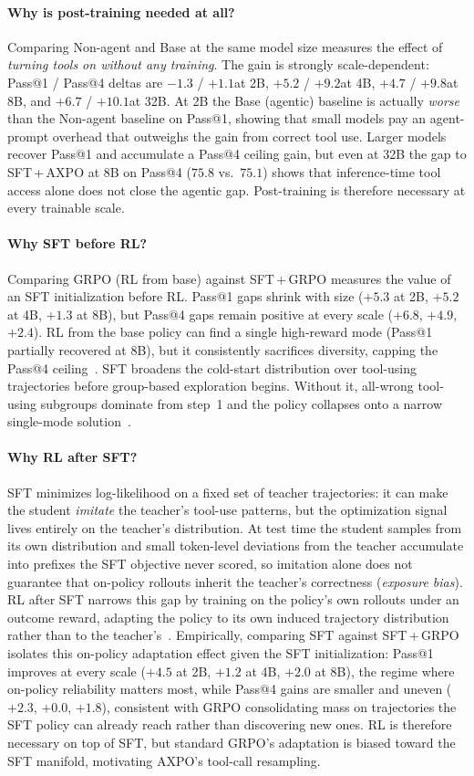 \documentclass{llmxive}
\providecommand{\toolresample}{tool-call resampling\xspace}
\providecommand{\eightBvsAgentPassFour}{$75.8$ vs.\ $75.1$}
\providecommand{\dAgentTwoB}{$-1.3$ / $+1.1$}
\providecommand{\dAgentFourB}{$+5.2$ / $+9.2$}
\providecommand{\dAgentEightB}{$+4.7$ / $+9.8$}
\providecommand{\dAgentThirtyTwoB}{$+6.7$ / $+10.1$}
\providecommand{\dSFTinitPassOne}{$+5.3$ at 2B, $+5.2$ at 4B, $+1.3$ at 8B}
\providecommand{\dSFTinitPassFour}{$+6.8$, $+4.9$, $+2.4$}
\providecommand{\dRLAfterSFTPassOne}{$+4.5$ at 2B, $+1.2$ at 4B, $+2.0$ at 8B}
\providecommand{\dRLAfterSFTPassFour}{$+2.3$, $+0.0$, $+1.8$}
\begin{document}
\paragraph{Why is post-training needed at all?}
Comparing Non-agent and Base at the same model size measures the effect of \emph{turning tools on without any training}. The gain is strongly scale-dependent: Pass@1 / Pass@4 deltas are \dAgentTwoB at 2B, \dAgentFourB at 4B, \dAgentEightB at 8B, and \dAgentThirtyTwoB at 32B. At 2B the Base (agentic) baseline is actually \emph{worse} than the Non-agent baseline on Pass@1, showing that small models pay an agent-prompt overhead that outweighs the gain from correct tool use. Larger models recover Pass@1 and accumulate a Pass@4 ceiling gain, but even at 32B the gap to SFT\,+\,AXPO at 8B on Pass@4 (\eightBvsAgentPassFour) shows that inference-time tool access alone does not close the agentic gap. Post-training is therefore necessary at every trainable scale.

\paragraph{Why SFT before RL?}
Comparing GRPO (RL from base) against SFT\,+\,GRPO measures the value of an SFT initialization before RL. Pass@1 gaps shrink with size (\dSFTinitPassOne), but Pass@4 gaps remain positive at every scale (\dSFTinitPassFour). RL from the base policy can find a single high-reward mode (Pass@1 partially recovered at 8B), but it consistently sacrifices diversity, capping the Pass@4 ceiling~\citep{rlvr}.
SFT broadens the cold-start distribution over tool-using trajectories before group-based exploration begins. Without it, all-wrong tool-using subgroups dominate from step~1 and the policy collapses onto a narrow single-mode solution~\citep{deepeyesv2}.

\paragraph{Why RL after SFT?}
SFT minimizes log-likelihood on a fixed set of teacher trajectories: it can make the student \emph{imitate} the teacher's tool-use patterns, but the optimization signal lives entirely on the teacher's distribution. At test time the student samples from its own distribution and small token-level deviations from the teacher accumulate into prefixes the SFT objective never scored, so imitation alone does not guarantee that on-policy rollouts inherit the teacher's correctness (\emph{exposure bias}).
RL after SFT narrows this gap by training on the policy's own rollouts under an outcome reward, adapting the policy to its own induced trajectory distribution rather than to the teacher's~\citep{rlgeneralize}.
Empirically, comparing SFT against SFT\,+\,GRPO isolates this on-policy adaptation effect given the SFT initialization: Pass@1 improves at every scale (\dRLAfterSFTPassOne), the regime where on-policy reliability matters most, while Pass@4 gains are smaller and uneven (\dRLAfterSFTPassFour), consistent with GRPO consolidating mass on trajectories the SFT policy can already reach rather than discovering new ones. RL is therefore necessary on top of SFT, but standard GRPO's adaptation is biased toward the SFT manifold, motivating AXPO's \toolresample.
\end{document}
